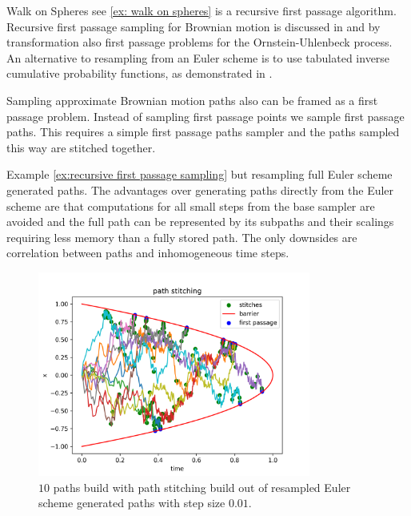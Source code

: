 \documentclass[a4paper,12pt]{article}
\begin{document}
\begin{related}
  Walk on Spheres see \ref{ex: walk on spheres} is a recursive first passage algorithm.
  Recursive first passage sampling for
  Brownian motion is discussed in \cite{herrmann_first-passage_2016}
  and by transformation also first passage problems for the
  Ornstein-Uhlenbeck process.
  An alternative to resampling from an Euler scheme is to use tabulated
  inverse cumulative probability functions,
  as demonstrated in \cite{hwang_simulationtabulation_2001}.
\end{related}


\begin{technique}
  Sampling approximate Brownian motion paths also can be
  framed as a first passage problem. Instead of sampling
  first passage points we sample first passage paths.
  This requires a simple first passage paths sampler and the paths
  sampled this way are stitched together.
\end{technique}

\begin{example}
  Example \ref{ex:recursive first passage sampling} but
  resampling full Euler scheme generated paths.
  The advantages over generating paths directly from
  the Euler scheme are that computations for all small steps from the
  base sampler are avoided and the full path
  can be represented by its subpaths and their scalings
  requiring less memory than a fully stored path.
  The only downsides are correlation between paths and
  inhomogeneous time steps.

  \begin{figure}[h!]
    \centering
    \includegraphics[width=0.8\textwidth]{plots/path_stitching_para.png}
    \caption{ $10$ paths build with path stitching build out of
      resampled Euler scheme generated paths with step size $0.01$.}
    \label{fig:path stitching para}
  \end{figure}
\end{example}
\end{document}
